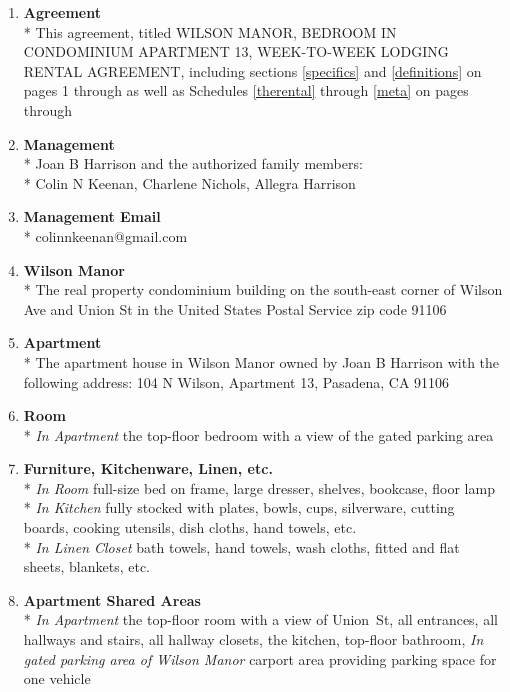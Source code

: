 \documentclass[]{article}
\newcommand{\agreementtitle}{WILSON MANOR, BEDROOM IN CONDOMINIUM APARTMENT 13, WEEK-TO-WEEK LODGING RENTAL AGREEMENT}
\newcommand{\agreementdef}{agreement, titled \agreementtitle{}, including sections \ref{specifics} and \ref{definitions} on pages 1 through \pageref{acceptance} as well as Schedules \ref{therental} through \ref{meta} on pages \pageref{therental} through \pageref{LastPage}}
\newcommand{\mom}{Joan B Harrison}
\newcommand{\management}{Management}
\newcommand{\myemail}{Management Email}
\newcommand{\condo}{Wilson Manor}
\newcommand{\apt}{Apartment}
\newcommand{\room}{Room}
\newcommand{\furniture}{Furniture, Kitchenware, Linen, etc.}
\newcommand{\shared}{Apartment Shared Areas}
\begin{document}
\begin{multicols}{2}
	\begin{enumerate} 
		\item \textbf{Agreement}\\* \label{agreement}
			This \agreementdef{}

			\vfill
			\columnbreak

		\item \textbf{\management{}}\\* \label{management}
			\noindent \mom{}
			and the authorized family members:\\*
			Colin N Keenan,
			Charlene Nichols,
			Allegra Harrison

		\item \textbf{\myemail{}}\\* \label{myemail}
			colinnkeenan@gmail.com

		\item \textbf{\condo{}}\\* \label{condo}
			The real property condominium building on the south-east corner of Wilson Ave and Union St in the United States Postal Service zip code 91106

		\item \textbf{\apt{}}\\* \label{apt}
			The apartment house in \condo{} owned by \mom{} with the following address:
			104 N Wilson, \apt{} 13,
			Pasadena, CA  91106

		\item \textbf{\room{}}\\* \label{room}
			\textit{In \apt{}}
			the top-floor bedroom with a view of the gated parking area

		\item \textbf{\furniture{}}\\* \label{furniture}
			\textit{In \room{}}
			full-size bed on frame, large dresser, shelves, bookcase, floor lamp\\*
			\textit{In Kitchen}
			fully stocked with plates, bowls, cups, silverware, cutting boards, cooking utensils, dish cloths, hand towels, etc.\\*
			\textit{In Linen Closet}
			bath towels, hand towels, wash cloths, fitted and flat sheets, blankets, etc.

		\item \textbf{\shared{}}\\* \label{shared}
			\textit{In \apt{}}
			the top-floor room with a view of Union~St,
			all entrances,
			all hallways and stairs,
			all hallway closets,
			the kitchen,
			top-floor bathroom,
			\textit{In gated parking area of \condo{}}
			carport area providing parking space for one vehicle
			

\end{enumerate}
\end{multicols}
\end{document}
